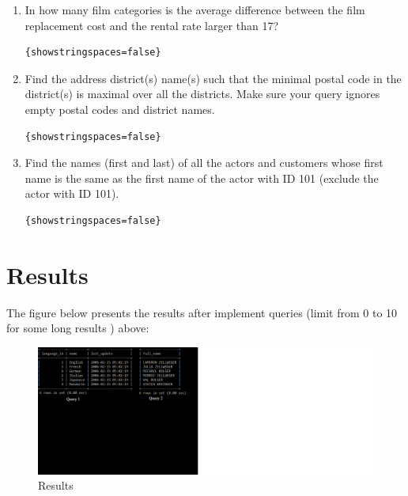 \documentclass{article}
\begin{document}
\begin{enumerate}
	\begin{lstlisting}{showstringspaces=false}

	\end{lstlisting}

	\item In how many film categories is the average difference between the film replacement cost and the rental rate larger than 17?
	
	\begin{lstlisting}{showstringspaces=false}

	\end{lstlisting}

	\item Find the address district(s) name(s) such that the minimal postal code in the district(s) is maximal over all the districts. Make sure your query ignores empty postal codes and district names.
	
	\begin{lstlisting}{showstringspaces=false}

	\end{lstlisting}
		
	\item Find the names (first and last) of all the actors and customers whose first name is the same as the first name of the actor with ID 101 (exclude the actor with ID 101).
	
	\begin{lstlisting}{showstringspaces=false}

	\end{lstlisting}
			
\end{enumerate}

\section*{Results}

The figure below presents the results after implement queries (limit from 0 to 10 for some long results
) above:\\
\begin{figure}
\includegraphics[scale = 0.9]{result.PNG}
\caption{Results}
\end{figure}
\end{document}
